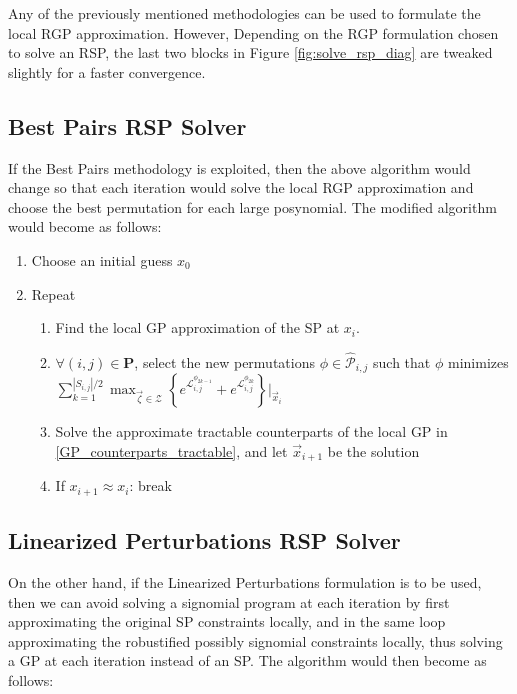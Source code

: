 Any of the previously mentioned methodologies can be used to formulate the local RGP approximation. 
However, Depending on the RGP formulation chosen to solve an RSP, the last two blocks in Figure \ref{fig:solve_rsp_diag} are tweaked slightly for a faster convergence. 
\ \\
\subsection{Best Pairs RSP Solver}
If the Best Pairs methodology is exploited, then the above algorithm would change so that each iteration would solve the local RGP approximation and choose the best permutation for each large posynomial. The modified algorithm would become as follows:

\begin{enumerate}
    \item Choose an initial guess $x_0$
    \item Repeat
    \begin{enumerate}
        \item Find the local GP approximation of the SP at $x_i$.
        \item $\forall (i,j) \in \mathbf{P}$, select the new permutations $\phi \in \hat{\mathcal{P}}_{i,j}$ such that $\phi$ minimizes $\textstyle{\sum}_{k=1}^{|S_{i,j}|/2} {\displaystyle \max_{\vec{\zeta} \in \mathcal{Z}}} \left\{e^{\mathcal{L}^{\phi_{2k-1}}_{i,j}} + e^{\mathcal{L}^{\phi_{2k}}_{i,j}}\right\}\bigg\rvert_{\vec{x}_i}$
        \item Solve the approximate tractable counterparts of the local GP in \eqref{GP_counterparts_tractable}, and let $\vec{x}_{i+1}$ be the solution
        \item If $x_{i+1} \approx x_{i}$: break
    \end{enumerate}
\end{enumerate}

\subsection{Linearized Perturbations RSP Solver}
On the other hand, if the Linearized Perturbations formulation is to be used, then we can avoid solving a signomial program at each iteration by first approximating the original SP constraints locally, and in the same loop approximating the robustified possibly signomial constraints locally, thus solving a GP at each iteration instead of an SP. The algorithm would then become as follows:

